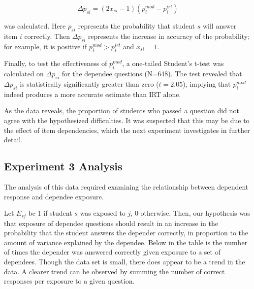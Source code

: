 \[
  \Delta p_{si} = (2x_{si}-1) (p_i^{mod} - p_i^{irt})
\]

was calculated. Here $p_{si}$ represents the probability that student $s$ will
answer item $i$ correctly.  Then $\Delta p_{si}$ represents the increase in
accuracy of the probability; for example, it is positive if $p_i^{mod} >
p_i^{irt}$ and $x_{si} = 1$.

Finally, to test the effectiveness of $p_i^{mod}$, a one-tailed Student's
t-test was calculated on $\Delta p_{si}$ for the dependee questions (N=648).
The test revealed that $\Delta p_{si}$ is statistically significantly greater
than zero ($t=2.05$), implying that $p_i^{mod}$ indeed produces a more accurate
estimate than IRT alone. 

As the data reveals, the proportion of students who passed a question did not
agree with the hypothesized difficulties.  It was suspected that this may be
due to the effect of item dependencies, which the next experiment investigates
in further detail.

\subsection{Experiment 3 Analysis}  

The analysis of this data required examining the relationship between dependent
response and dependee exposure.

Let $E_{sj}$ be 1 if student $s$ was exposed to $j$, 0 otherwise.  Then, our
hypothesis was that exposure of dependee questions should result in an increase
in the probability that the student answers the depender correctly, in
proportion to the amount of variance explained by the dependee.  Below in the
table is the number of times the depender was answered correctly given
exposure to a set of dependees.  Though the data set is small, there does
appear to be a trend in the data.  A clearer trend can be observed by summing
the number of correct responses per exposure to a given question.

